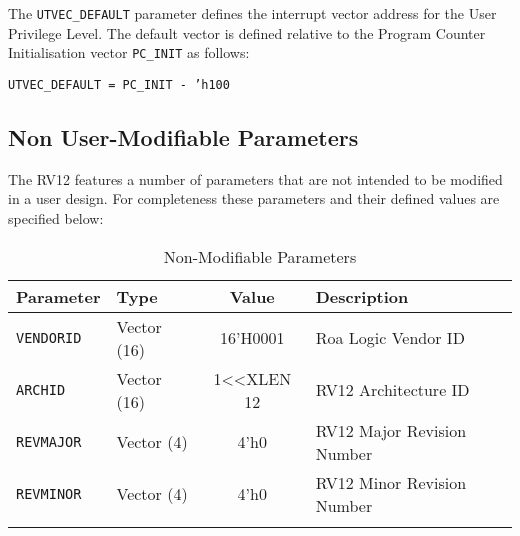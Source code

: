 The \texttt{UTVEC\_DEFAULT} parameter defines the interrupt vector address for
the User Privilege Level. The default vector is defined relative to the
Program Counter Initialisation vector \texttt{PC\_INIT} as follows:

\texttt{UTVEC\_DEFAULT = PC\_INIT - 'h100}

\subsection{Non User-Modifiable Parameters} \label{non-user-modifiable-parameters}

The RV12 features a number of parameters that are not intended to be
modified in a user design. For completeness these parameters and their
defined values are specified below:

\begin{longtable}[]{@{}llcl@{}}
\toprule
Parameter & Type & Value & Description\tabularnewline
\midrule
\endhead
\texttt{VENDORID} & Vector (16) & 16'H0001 & Roa Logic Vendor ID\tabularnewline
\texttt{ARCHID} & Vector (16) & 1\textless{}\textless{}XLEN \textbar{} 12 & RV12
Architecture ID\tabularnewline
\texttt{REVMAJOR} & Vector (4) & 4'h0 & RV12 Major Revision Number\tabularnewline
\texttt{REVMINOR} & Vector (4) & 4'h0 & RV12 Minor Revision Number\tabularnewline
\bottomrule
\caption{Non-Modifiable Parameters}
\label{tab:nonmod-parameters}
\end{longtable}